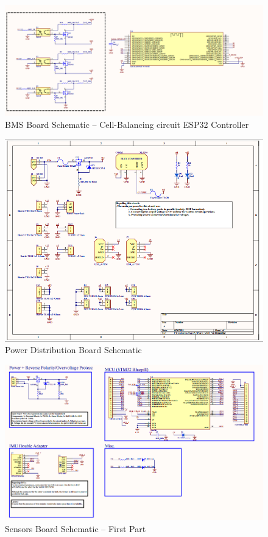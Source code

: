 \begin{figure}[h!]
	\centering
	\includegraphics[scale=0.4]{Figures/HW/schem-bms-2.png}
	\caption{BMS Board Schematic -- Cell-Balancing circuit ESP32 Controller}
	\label{fig:hw-bms-schem-2}
\end{figure}

\begin{figure}[h!]
	\centering
	\includegraphics[scale=0.4]{Figures/HW/schem-pwr.png}
	\caption{Power Distribution Board Schematic}
	\label{fig:hw-pwr-schem}
\end{figure}

\newpage

\begin{figure}[h!]
	\centering
	\includegraphics[scale=0.4]{Figures/HW/schem-sensi-1.png}
	\caption{Sensors Board Schematic -- First Part}
	\label{fig:hw-sensi-schem-1}
\end{figure}

